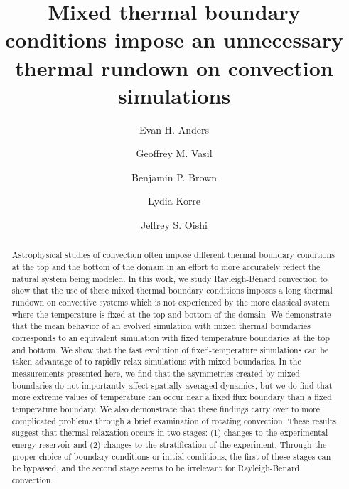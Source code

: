 \documentclass[aps, pre, onecolumn, nofootinbib, notitlepage, groupedaddress, amsfonts, amssymb, amsmath, longbibliography]{revtex4-1}
\newcommand{\RB}{Rayleigh-B\'{e}nard }
\begin{document}
\author{Evan H. Anders}
\author{Geoffrey M. Vasil}
\author{Benjamin P. Brown}
\author{Lydia Korre}
\author{Jeffrey S. Oishi}

\title{Mixed thermal boundary conditions impose an unnecessary thermal rundown on convection simulations}

\begin{abstract}
Astrophysical studies of convection often impose different thermal boundary conditions at the top and the bottom of the domain in an effort to more accurately reflect the natural system being modeled.
In this work, we study \RB convection to show that the use of these mixed thermal boundary conditions imposes a long thermal rundown on convective systems which is not experienced by the more classical system where the temperature is fixed at the top and bottom of the domain.
We demonstrate that the mean behavior of an evolved simulation with mixed thermal boundaries corresponds to an equivalent simulation with fixed temperature boundaries at the top and bottom.
We show that the fast evolution of fixed-temperature simulations can be taken advantage of to rapidly relax simulations with mixed boundaries.
In the measurements presented here, we find that the asymmetries created by mixed boundaries do not importantly affect spatially averaged dynamics, but we do find that more extreme values of temperature can occur near a fixed flux boundary than a fixed temperature boundary.
We also demonstrate that these findings carry over to more complicated problems through a brief examination of rotating convection.
These results suggest that thermal relaxation occurs in two stages: (1) changes to the experimental energy reservoir and (2) changes to the stratification of the experiment.
Through the proper choice of boundary conditions or initial conditions, the first of these stages can be bypassed, and the second stage seems to be irrelevant for \RB convection.
\end{abstract}
\maketitle
\end{document}
